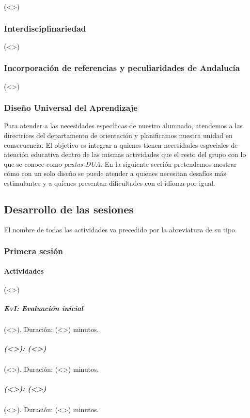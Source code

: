 \documentclass[12pt]{article}
\begin{document}
(<>)

\subsubsection{Interdisciplinariedad}

(<>)

\subsubsection{Incorporación de referencias y peculiaridades de Andalucía}

(<>)

\subsubsection{Diseño Universal del Aprendizaje}

Para atender a las necesidades específicas de nuestro alumnado, atendemos a las directrices del departamento de orientación y planificamos nuestra unidad en consecuencia. El objetivo es integrar a quienes tienen necesidades especiales de atención educativa dentro de las mismas actividades que el resto del grupo con lo que se conoce como \textit{pautas DUA}. En la siguiente sección pretendemos mostrar cómo con un solo diseño se puede atender a quienes necesitan desafíos más estimulantes y a quienes presentan dificultades con el idioma por igual.

\subsection{Desarrollo de las sesiones}

El nombre de todas las actividades va precedido por la abreviatura de su tipo.

\subsubsection{Primera sesión}

\paragraph*{Actividades} (<>)

\subparagraph{\textsc{EvI}: Evaluación inicial} (<>). Duración: (<>) minutos.

\subparagraph{\textsc{(<>)}: (<>)} (<>). Duración: (<>) minutos.

\subparagraph{\textsc{(<>)}: (<>)} (<>). Duración: (<>) minutos.
\end{document}
